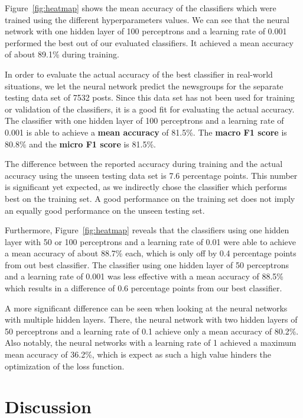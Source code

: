\documentclass[sigconf]{acmart}
\begin{document}
Figure~\ref{fig:heatmap} shows the mean accuracy of the classifiers which were trained using the different hyperparameters values. We can see that the neural network with one hidden layer of 100 perceptrons and a learning rate of 0.001 performed the best out of our evaluated classifiers. It achieved a mean accuracy of about 89.1\% during training. 

In order to evaluate the actual accuracy of the best classifier in real-world situations, we let the neural network predict the newsgroups for the separate testing data set of 7532 posts. Since this data set has not been used for training or validation of the classifiers, it is a good fit for evaluating the actual accuracy. The classifier with one hidden layer of 100 perceptrons and a learning rate of 0.001 is able to achieve a \textbf{mean accuracy} of 81.5\%. The \textbf{macro F1 score} is 80.8\% and the \textbf{micro F1 score} is 81.5\%.

The difference between the reported accuracy during training and the actual accuracy using the unseen testing data set is 7.6 percentage points. This number is significant yet expected, as we indirectly chose the classifier which performs best on the training set. A good performance on the training set does not imply an equally good performance on the unseen testing set.

Furthermore, Figure~\ref{fig:heatmap} reveals that the classifiers using one hidden layer with 50 or 100 perceptrons and a learning rate of 0.01 were able to achieve a mean accuracy of about 88.7\% each, which is only off by 0.4 percentage points from out best classifier. The classifier using one hidden layer of 50 perceptrons and a learning rate of 0.001 was less effective with a mean accuracy of 88.5\% which results in a difference of 0.6 percentage points from our best classifier.

A more significant difference can be seen when looking at the neural networks with multiple hidden layers. There, the neural network with two hidden layers of 50 perceptrons and a learning rate of 0.1 achieve only a mean accuracy of 80.2\%.
Also notably, the neural networks with a learning rate of 1 achieved a maximum mean accuracy of 36.2\%, which is expect as such a high value hinders the optimization of the loss function.

\section{Discussion}
\end{document}
